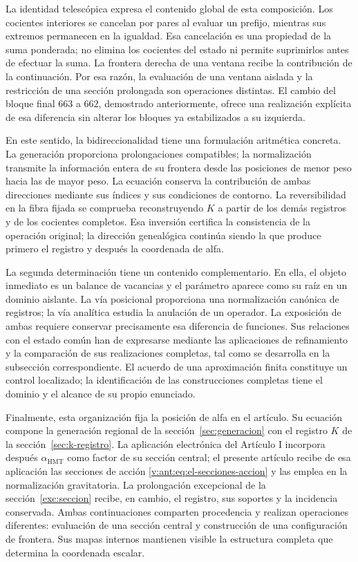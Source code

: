 La identidad telescópica expresa el contenido global de esta composición.
Los cocientes interiores se cancelan por pares al evaluar un prefijo,
mientras sus extremos permanecen en la igualdad. Esa cancelación es una
propiedad de la suma ponderada; no elimina los cocientes del estado ni
permite suprimirlos antes de efectuar la suma. La frontera derecha de una
ventana recibe la contribución de la continuación. Por esa razón, la
evaluación de una ventana aislada y la restricción de una sección
prolongada son operaciones distintas. El cambio del bloque final $663$ a
$662$, demostrado anteriormente, ofrece una realización explícita de esa
diferencia sin alterar los bloques ya estabilizados a su izquierda.

En este sentido, la bidireccionalidad tiene una formulación aritmética
concreta. La generación proporciona prolongaciones compatibles; la
normalización transmite la información entera de su frontera desde las
posiciones de menor peso hacia las de mayor peso. La ecuación conserva la
contribución de ambas direcciones mediante sus índices y sus condiciones
de contorno. La reversibilidad en la fibra fijada se comprueba reconstruyendo
$K$ a partir de los demás registros y de los cocientes completos. Esa
inversión certifica la consistencia de la operación original; la dirección
genealógica continúa siendo la que produce primero el registro y después
la coordenada de alfa.

La segunda determinación tiene un contenido complementario. En ella, el
objeto inmediato es un balance de vacancias y el parámetro aparece como
su raíz en un dominio aislante. La vía posicional proporciona una
normalización canónica de registros; la vía analítica estudia la anulación
de un operador. La exposición de ambas requiere conservar precisamente
esa diferencia de funciones. Sus relaciones con el estado común han de
expresarse mediante las aplicaciones de refinamiento y la comparación de
sus realizaciones completas, tal como se desarrolla en la subsección
correspondiente. El acuerdo de una aproximación finita constituye un
control localizado; la identificación de las construcciones completas
tiene el dominio y el alcance de su propio enunciado.

Finalmente, esta organización fija la posición de alfa en el artículo. Su
ecuación compone la generación regional de la sección~\ref{sec:generacion}
con el registro \(K\) de la sección~\ref{sec:k-registro}. La aplicación
electrónica del Artículo I incorpora después \(\alpha_{\mathrm{HMT}}\) como
factor de su sección central; el presente artículo recibe de esa aplicación
las secciones de acción \eqref{v:ant:eq:el-secciones-accion} y las emplea en
la normalización gravitatoria. La prolongación excepcional de la
sección~\ref{exc:seccion} recibe, en cambio, el registro, sus soportes y la
incidencia conservada. Ambas continuaciones comparten procedencia y realizan
operaciones diferentes: evaluación de una sección central y construcción de
una configuración de frontera. Sus mapas internos mantienen visible la
estructura completa que determina la coordenada escalar.
